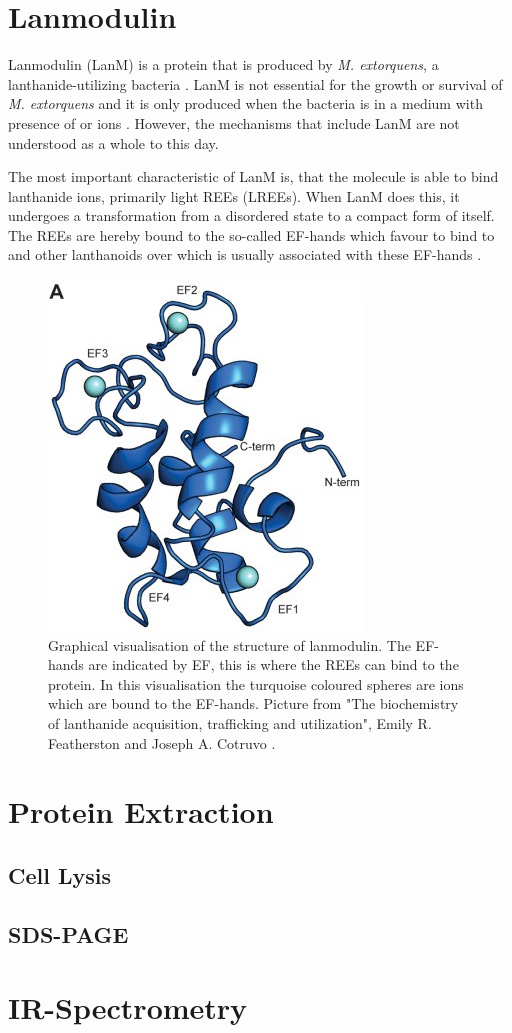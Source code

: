 \section{Lanmodulin\authorA}

Lanmodulin (LanM) is a protein that is produced by \textit{M. extorquens}, a lanthanide-utilizing bacteria \cite{lanmdiscovery}. LanM is not essential for the growth or survival of \textit{M. extorquens} and it is only produced when the bacteria is in a medium with presence of  or  ions \cite{lanmroleinbiology}. However, the mechanisms that include LanM are not understood as a whole to this day. 

The most important characteristic of LanM is, that the molecule is able to bind lanthanide ions, primarily light REEs (LREEs). When LanM does this, it undergoes a transformation from a disordered state to a compact form of itself. The REEs are hereby bound to the so-called EF-hands which favour to bind to  and other lanthanoids over  which is usually associated with these EF-hands \cite{lanmstructure}.

\begin{figure}[H]
	\centering
	\includegraphics[width=0.5\linewidth]{./media/images/lanm_structure.jpg}
  	\caption{Graphical visualisation of the structure of lanmodulin. The EF-hands are indicated by EF, this is where the REEs can bind to the protein. In this visualisation the turquoise coloured spheres are  ions which are bound to the EF-hands. Picture from "The biochemistry of lanthanide acquisition, trafficking and utilization", Emily R. Featherston and Joseph A. Cotruvo \cite{lanmroleinbiology}.}
  	\label{lanmstructure_p}
\end{figure}

\section{Protein Extraction}

\subsection{Cell Lysis}

\subsection{SDS-PAGE}

\section{IR-Spectrometry}